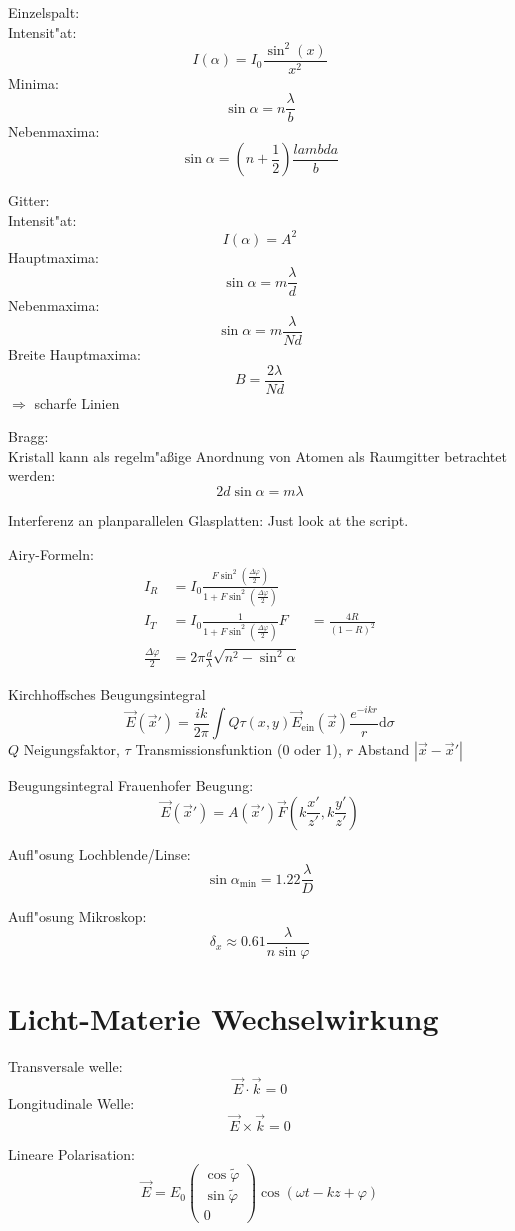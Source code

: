 \documentclass[12pt]{report}
\newcommand{\vphi}{\varphi}
\newcommand{\dd}{\mathrm{d}}
\begin{document}
Einzelspalt:\\
Intensit"at: \[I(\alpha)=I_0\frac{\sin^2(x)}{x^2}\]
Minima: \[\sin\alpha=n\frac{\lambda}{b}\]
Nebenmaxima: \[\sin\alpha=\left(n+\frac{1}{2}\right)\frac{lambda}{b}\]

Gitter:\\
Intensit"at: \[I(\alpha)=A^2\]
Hauptmaxima: \[\sin\alpha=m\frac{\lambda}{d}\]
Nebenmaxima: \[\sin\alpha=m\frac{\lambda}{Nd}\]
Breite Hauptmaxima: \[B=\frac{2\lambda}{Nd}\]
$\Rightarrow$ scharfe Linien

Bragg:\\
Kristall kann als regelm"a\ss ige Anordnung von Atomen als Raumgitter betrachtet werden:
\[2d\sin\alpha=m\lambda\]

Interferenz an planparallelen Glasplatten:
Just look at the script.

Airy-Formeln:
\begin{align*}
I_R&=I_0\frac{F\sin^2\left(\frac{\Delta\vphi}{2}\right)}{1+F\sin^2\left(\frac{\Delta\vphi}{2}\right)}\\
I_T&=I_0\frac{1}{1+F\sin^2\left(\frac{\Delta\vphi}{2}\right)}
F&=\frac{4R}{(1-R)^2}\\
\frac{\Delta\vphi}{2}&=2\pi\frac{d}{\lambda}\sqrt{n^2-\sin^2\alpha}
\end{align*}

Kirchhoffsches Beugungsintegral
\[\vec{E}(\vec{x}')=\frac{ik}{2\pi}\int Q\tau(x,y)\vec{E}_\mathrm{ein}(\vec{x})\frac{e^{-ikr}}{r}\dd\sigma\]
$Q$ Neigungsfaktor, $\tau$ Transmissionsfunktion (0 oder 1), $r$ Abstand $|\vec{x}-\vec{x}'|$

Beugungsintegral Frauenhofer Beugung:
\[\vec{E}(\vec{x}')=A(\vec{x}')\vec{F}\left(k\frac{x'}{z'},k\frac{y'}{z'}\right)\]

Aufl"osung Lochblende/Linse:
\[\sin\alpha_\mathrm{min}=1.22\frac{\lambda}{D}\]

Aufl"osung Mikroskop:
\[\delta_x\approx0.61\frac{\lambda}{n\sin\vphi}\]

\section{Licht-Materie Wechselwirkung}


Transversale welle:
\[\vec{E}\cdot\vec{k}=0\]
Longitudinale Welle:
\[\vec{E}\times\vec{k}=0\]

Lineare Polarisation:
\[\vec{E}=E_0\begin{pmatrix}\cos\tilde{\vphi}\\\sin\tilde{\vphi}\\0\end{pmatrix}\cos(\omega t-kz+\vphi)\]
\end{document}
